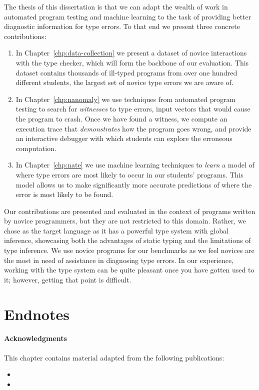 The thesis of this dissertation is that we can adapt the wealth of work
in automated program testing and machine learning to the task of
providing better diagnostic information for type errors.
%
To that end we present three concrete contributions:
%
\begin{enumerate}
\item In Chapter~\ref{chp:data-collection} we present a dataset of
  novice interactions with the \ocaml type checker, which will form the
  backbone of our evaluation.
  This dataset contains thousands of ill-typed programs from over one
  hundred different students, the largest set of novice type errors we
  are aware of.
\item In Chapter~\ref{chp:nanomaly} we use techniques from automated
  program testing to search for \emph{witnesses} to type errors, \ie
  input vectors that would cause the program to crash.
  Once we have found a witness, we compute an execution trace that
  \emph{demonstrates} how the program goes wrong, and provide an
  interactive debugger with which students can explore the erroneous
  computation.

\item In Chapter~\ref{chp:nate} we use machine learning techniques to
  \emph{learn} a model of where type errors are most likely to occur in
  our students' programs.
  This model allows us to make significantly more accurate predictions
  of where the error is most likely to be found.
\end{enumerate}

Our contributions are presented and evaluated in the context of \ocaml
programs written by novice programmers, but they are not restricted to
this domain.
%
Rather, we chose \ocaml as the target language as it has a powerful type
system with global inference, showcasing both the advantages of static
typing and the limitations of type inference.
%
We use novice programs for our benchmarks as we feel novices are the
most in need of assistance in diagnosing type errors.
%
In our experience, working with the type system can be quite pleasant
once you have gotten used to it; however, getting that point is
difficult.
%

\section*{Endnotes}
\paragraph{Acknowledgments}
This chapter contains material adapted from the following publications:
\begin{itemize}
\item {}
\item {}
\end{itemize}



